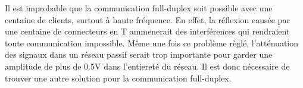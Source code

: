 Il est improbable que la communication full-duplex soit possible avec une centaine de clients, surtout à haute fréquence.
En effet, la réflexion causée par une centaine de connecteurs en T ammenerait des interférences qui rendraient toute communication impossible.
Même une fois ce problème règlé, l'atténuation des signaux dans un réseau passif serait trop importante pour garder une amplitude de plus de 0.5V dans l'entiereté du réseau.
Il est donc nécessaire de trouver une autre solution pour la communication full-duplex.
